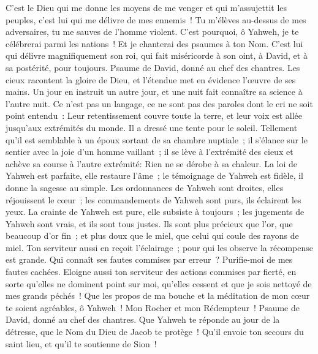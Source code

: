 \begin{multicols}{2}
C'est le Dieu qui me donne les moyens de me venger et qui m'assujettit les peuples,
c'est lui qui me délivre de mes ennemis~! Tu m'élèves au-dessus de mes adversaires, tu me sauves de l'homme violent.
C'est pourquoi, ô Yahweh, je te célébrerai parmi les nations~! Et je chanterai des psaumes à ton Nom.
C'est lui qui délivre magnifiquement son roi, qui fait miséricorde à son oint, à David, et à sa postérité, pour toujours.
\VerseOne{}Psaume de David, donné au chef des chantres.
Les cieux racontent la gloire de Dieu, et l'étendue met en évidence l'œuvre de ses mains.
Un jour en instruit un autre jour, et une nuit fait connaître sa science à l'autre nuit.
Ce n'est pas un langage, ce ne sont pas des paroles dont le cri ne soit point entendu~:
Leur retentissement couvre toute la terre, et leur voix est allée jusqu'aux extrémités du monde. Il a dressé une tente pour le soleil.
Tellement qu'il est semblable à un époux sortant de sa chambre nuptiale~; il s'élance sur le sentier avec la joie d'un homme vaillant~;
il se lève à l'extrémité des cieux et achève sa course à l'autre extrémité: Rien ne se dérobe à sa chaleur.
La loi de Yahweh est parfaite, elle restaure l'âme~; le témoignage de Yahweh est fidèle, il donne la sagesse au simple.
Les ordonnances de Yahweh sont droites, elles réjouissent le cœur~; les commandements de Yahweh sont purs, ils éclairent les yeux.
La crainte de Yahweh est pure, elle subsiste à toujours~; les jugements de Yahweh sont vrais, et ils sont tous justes.
Ils sont plus précieux que l'or, que beaucoup d'or fin~; et plus doux que le miel, que celui qui coule des rayons de miel.
Ton serviteur aussi en reçoit l'éclairage~; pour qui les observe la récompense est grande.
Qui connaît ses fautes commises par erreur~? Purifie-moi de mes fautes cachées.
Eloigne aussi ton serviteur des actions commises par fierté, en sorte qu'elles ne dominent point sur moi, qu'elles cessent et que je sois nettoyé de mes grands péchés~!
Que les propos de ma bouche et la méditation de mon cœur te soient agréables, ô Yahweh~! Mon Rocher et mon Rédempteur~!
\VerseOne{}Psaume de David, donné au chef des chantres.
Que Yahweh te réponde au jour de la détresse, que le Nom du Dieu de Jacob te protège~!
Qu'il envoie ton secours du saint lieu, et qu'il te soutienne de Sion~!

\end{multicols}
